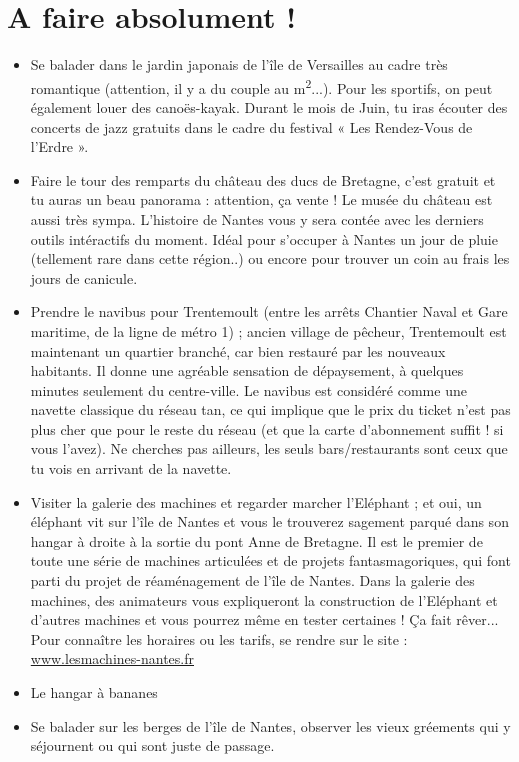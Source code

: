 \section{A faire absolument !}\trad
\begin{itemize}
  \item Se balader dans le jardin japonais de l'île de Versailles au cadre très romantique (attention, il y a du couple au m\textsuperscript{2}...). Pour les sportifs, on peut également louer des canoës-kayak. Durant le mois de Juin, tu iras écouter des concerts de jazz gratuits dans le cadre du festival « Les Rendez-Vous de l'Erdre ».
  \item Faire le tour des remparts du château des ducs de Bretagne, c'est gratuit et tu auras un beau panorama : attention, ça vente ! Le musée du château est aussi très sympa. L'histoire de Nantes vous y sera contée avec les derniers outils intéractifs du moment. Idéal pour s'occuper à Nantes un jour de pluie (tellement rare dans cette région..) ou encore pour trouver un coin au frais les jours de canicule.
  \item Prendre le navibus pour Trentemoult (entre les arrêts Chantier Naval et Gare maritime, de la ligne de métro 1) ; ancien village de pêcheur, Trentemoult est maintenant un quartier branché, car bien restauré par les nouveaux habitants. Il donne une agréable sensation de dépaysement, à quelques minutes seulement du centre-ville. Le navibus est considéré comme une navette classique du réseau tan, ce qui implique que le prix du ticket n'est pas plus cher que pour le reste du réseau (et que la carte d'abonnement suffit ! si vous l'avez). Ne cherches pas ailleurs, les seuls bars/restaurants sont ceux que tu vois en arrivant de la navette.
  \item Visiter la galerie des machines et regarder marcher l'Eléphant ; et oui, un éléphant vit sur l'île de Nantes et vous le trouverez sagement parqué dans son hangar à droite à la sortie du pont Anne de Bretagne. Il est le premier de toute une série de machines articulées et de projets fantasmagoriques, qui font parti du projet de réaménagement de l'île de Nantes. Dans la galerie des machines, des animateurs vous expliqueront la construction de l'Eléphant et d'autres machines et vous pourrez même en tester certaines ! Ça fait rêver... Pour connaître les horaires ou les tarifs, se rendre sur le site : \url{www.lesmachines-nantes.fr}
  \item Le hangar à bananes
  \item Se balader sur les berges de l'île de Nantes, observer les vieux gréements qui y séjournent ou qui sont juste de passage.
\end{itemize}

